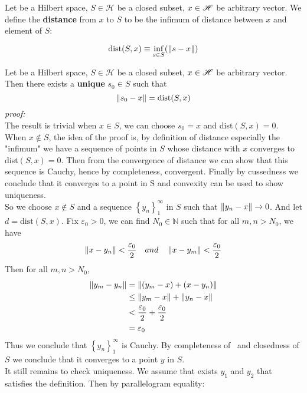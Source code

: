 \begin{definition}\rm\nextline
	Let \hbs be a Hilbert space, $S\in \mathscr{H}$ be a closed subset, $x\in \mathscr{H}$ be arbitrary vector. We define the {\bf{distance}} from $x$ to $S$ to be the infimum of distance between $x$ and element of $S$:

	$$\text{dist}(S,x)\equiv\inf_{s\in S} (\left\|{s-x}\right\|)$$

\end{definition}
\begin{proposition}\rm\label{Nearest Point Property}\nextline
	Let \hbs be a Hilbert space, $S\in \mathscr{H}$ be a closed subset, $x\in \mathscr{H}$ be arbitrary vector. Then there exists a {\bf{unique}} $s_0\in S$ such that
	$$
		\left\|{s_0-x}\right\|= \text{dist}(S,x)
	$$
	\textit{proof:}\\
	The result is trivial when $x\in S$, we can choose $s_0=x$ and dist$(S,x)=0$.\\
	When $x\notin S$, the idea of the proof is, by definition of distance especially the "infimum" we have a sequence of points in $S$ whose distance with $x$ converges to dist$(S,x)=0$. Then from the convergence of distance we can show that this sequence is Cauchy, hence by completeness, convergent. Finally by cussedness we conclude that it converges to a point in S and convexity can be used to show uniqueness. \\
	So we choose $x\notin S$ and a sequence $\left\{y_n\right\}_1^\infty$ in $S$ such that $\left\|{y_n-x}\right\|\xrightarrow{}0$. And let $d=\text{dist}(S,x)$.
	Fix $\varepsilon_0>0$, we can find $N_0\in\mathbb{N}$ such that for all $m,n>N_0$, we have $$\left\|{x-y_n}\right\|<\frac{\varepsilon_0}{2}\quad and\quad \left\|{x-y_m}\right\|<\frac{\varepsilon_0}{2}
	$$
	Then for all $m,n>N_0$,
	\begin{equation}
		\begin{split}
			\left\|{y_m-y_n}\right\|&=\left\|{(y_m-x)+(x-y_n)}\right\|\\
			&\leq\left\|{y_m-x}\right\|+\left\|{y_n-x}\right\|\\
			&<\frac{\varepsilon_0}{2}+\frac{\varepsilon_0}{2}\\
			&=\varepsilon_0
		\end{split}
	\end{equation}
	Thus we conclude that $\left\{y_n\right\}_1^\infty$ is Cauchy. By completeness of \hbs  \, and closedness of $S$ we conclude that it converges to a point $y$ in $S$.\\
	It still remains to check uniqueness. We assume that exists $y_1$ and $y_2$ that satisfies the definition. Then by parallelogram equality:

\end{proposition}
